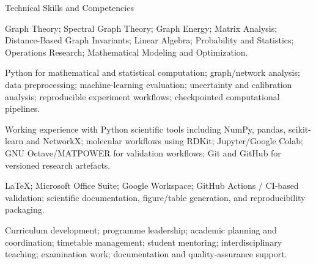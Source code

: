 \begin{rubric}{Technical Skills and Competencies}

\entry*[Mathematics]%
Graph Theory; Spectral Graph Theory; Graph Energy; Matrix Analysis; Distance-Based Graph Invariants; Linear Algebra; Probability and Statistics; Operations Research; Mathematical Modeling and Optimization.

%
Python for mathematical and statistical computation; graph/network analysis; data preprocessing; machine-learning evaluation; uncertainty and calibration analysis; reproducible experiment workflows; checkpointed computational pipelines.

%
Working experience with Python scientific tools including NumPy, pandas, scikit-learn and NetworkX; molecular workflows using RDKit; Jupyter/Google Colab; GNU Octave/MATPOWER for validation workflows; Git and GitHub for versioned research artefacts.

\entry*[Tools]%
\LaTeX; Microsoft Office Suite; Google Workspace; GitHub Actions / CI-based validation; scientific documentation, figure/table generation, and reproducibility packaging.

\entry*[Academic]%
Curriculum development; programme leadership; academic planning and coordination; timetable management; student mentoring; interdisciplinary teaching; examination work; documentation and quality-assurance support.

\end{rubric}
